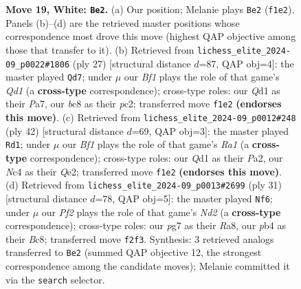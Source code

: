 \documentclass[11pt]{article}
\begin{document}
\begin{figure}[p]
\caption{\textbf{Move 19, White: \texttt{Be2}.} (a) Our position; Melanie plays \texttt{Be2} (\texttt{f1e2}). Panels (b)--(d) are the retrieved master positions whose correspondence most drove this move (highest QAP objective among those that transfer to it). (b) Retrieved from \texttt{lichess\_elite\_2024-09\_p0022\#1806} (ply 27) [structural distance $d$=87, QAP obj=4]: the master played \texttt{Qd7}; under $\mu$ our \emph{Bf1} plays the role of that game's \emph{Qd1} (a \textbf{cross-type} correspondence); cross-type roles: our \emph{Q}d1 as their \emph{P}a7, our \emph{b}c8 as their \emph{p}c2; transferred move \texttt{f1e2} \textbf{(endorses this move)}. (c) Retrieved from \texttt{lichess\_elite\_2024-09\_p0012\#248} (ply 42) [structural distance $d$=69, QAP obj=3]: the master played \texttt{Rd1}; under $\mu$ our \emph{Bf1} plays the role of that game's \emph{Ra1} (a \textbf{cross-type} correspondence); cross-type roles: our \emph{Q}d1 as their \emph{P}a2, our \emph{N}c4 as their \emph{Q}e2; transferred move \texttt{f1e2} \textbf{(endorses this move)}. (d) Retrieved from \texttt{lichess\_elite\_2024-09\_p0013\#2699} (ply 31) [structural distance $d$=78, QAP obj=5]: the master played \texttt{Nf6}; under $\mu$ our \emph{Pf2} plays the role of that game's \emph{Nd2} (a \textbf{cross-type} correspondence); cross-type roles: our \emph{p}g7 as their \emph{R}a8, our \emph{p}b4 as their \emph{B}c8; transferred move \texttt{f2f3}. Synthesis: 3 retrieved analogs transferred to \texttt{Be2} (summed QAP objective 12, the strongest correspondence among the candidate moves); Melanie committed it via the \texttt{search} selector.}
\label{fig:thought-m36}
\end{figure}

\clearpage
\end{document}
